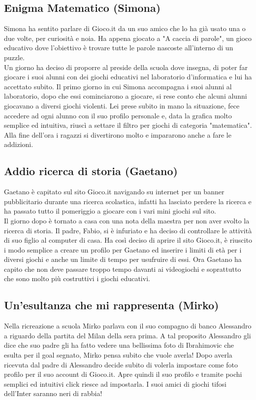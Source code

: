 \documentclass[../Report.tex]{subfiles}
\begin{document}
    \subsection{Enigma Matematico (Simona)}
    Simona ha sentito parlare di Gioco.it da un suo amico che lo  ha già usato una o due volte, per curiosità e noia. Ha appena giocato a "A caccia di parole", un gioco educativo dove l'obiettivo è trovare tutte le parole nascoste all'interno di un puzzle.\\
    Un giorno ha deciso di proporre al preside della scuola dove insegna, di poter far giocare i suoi alunni con dei giochi educativi nel laboratorio d'informatica e lui ha accettato subito. Il primo giorno in cui Simona accompagna i suoi alunni al laboratorio, dopo che essi cominciarono a giocare, si rese conto che alcuni alunni giocavano a diversi giochi violenti. Lei prese subito in mano la situazione, fece accedere ad ogni alunno con il suo profilo personale e, data la grafica molto semplice ed intuitiva, riuscì a settare il filtro per giochi di categoria "matematica". Alla fine dell'ora i ragazzi si divertirono molto e impararono anche a fare le addizioni.

    \subsection{Addio ricerca di storia (Gaetano)}
    Gaetano è capitato sul sito Gioco.it navigando su internet per un banner pubblicitario durante una ricerca scolastica, infatti ha lasciato perdere la ricerca e ha passato tutto il pomeriggio a giocare con i vari mini giochi sul sito.\\
    Il giorno dopo è tornato a casa con una nota della maestra per non aver svolto la ricerca di storia. Il padre, Fabio, si è infuriato e ha deciso di controllare le attività di suo figlio al computer di casa. Ha così deciso di aprire il sito Gioco.it, è riuscito i modo semplice a creare un profilo per Gaetano ed inserire i limiti di età per i diversi giochi e anche un limite di tempo per usufruire di essi. Ora Gaetano ha capito che non deve passare troppo tempo davanti ai videogiochi e soprattutto che sono molto più costruttivi i giochi educativi.

    \subsection{Un'esultanza che mi rappresenta (Mirko)}
    Nella ricreazione a scuola Mirko parlava con il suo compagno di banco Alessandro a riguardo della partita del Milan della sera prima. A tal proposito Alessandro gli dice che suo padre gli ha fatto vedere una bellissima foto di Ibrahimovic che esulta per il goal segnato, Mirko pensa subito che vuole averla! Dopo averla ricevuta dal padre di Alessandro decide subito di volerla impostare come foto profilo per il suo account di Gioco.it. Apre quindi il suo profilo e tramite pochi semplici ed intuitivi click riesce ad impostarla. I suoi amici di giochi tifosi dell'Inter saranno neri di rabbia!
\end{document}
